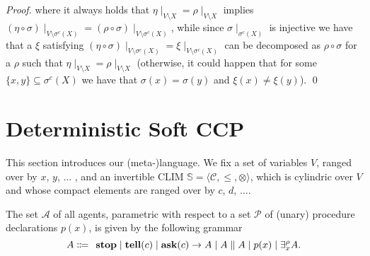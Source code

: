 \documentclass{llncs}
\newcommand{\comment}[1]{}
\newcommand{\tell}{{\bf tell}}
\newcommand{\ask}{{\bf ask}}
\newcommand{\ostop}{{\bf stop}}
\def\monop{\otimes}
\begin{document}
\begin{proof}
\noindent
where it always holds that $\eta\mid_{V \setminus X} = \rho\mid_{V \setminus X}$ implies $(\eta\circ \sigma)\mid_{V \setminus \sigma^{c}(X)} = (\rho\circ \sigma)\mid_{V \setminus \sigma^{c}(X)}$,
while since $\sigma \mid_{\sigma^c(X)}$ is injective we have that
a $\xi$ satisfying $(\eta \circ \sigma)\mid_{V \setminus \sigma^{c}(X)} = \xi\mid_{V \setminus \sigma^{c}(X)}$ can be decomposed as $\rho\circ \sigma$
for a $\rho$ such that $\eta\mid_{V \setminus X} = \rho\mid_{V \setminus X}$
(otherwise, it could happen that for some $\{x, y\} \subseteq \sigma^c(X)$ we have that $\sigma(x) =\sigma(y)$ and 
$\xi(x) \neq \xi(y)$).
\qed
\end{proof}

%


\comment{
Note also that the diagonal elements are not guaranteed to be $\monop$-compact,
even if they have finite support, since $\top$ is not necessarily so.
%
To this end, we close the section by adding the simple result below to the soft constraint lore.

\begin{proposition}
	Let $c \in \mathbb{C}$ be a constraint. It is $\monop$-compact if and only if it has finite support and 
	$c\eta$ is $\monop$-compact for all $\eta$.
\end{proposition}
}

\section{Deterministic Soft CCP}\label{sec:detSCCP}
This section introduces our (meta-)language.
We fix a set of variables $V$, ranged over by $x$, $y$, $\ldots$ , and 
an invertible CLIM $\mathbb S = \langle {\mathcal C}, \leq, \otimes\rangle$, which is 
cylindric over $V$ and whose compact elements
are ranged over by $c$, $d$, $\ldots$.

\begin{definition}[Agents]%
The set $\mathcal{A}$ of all agents, %
parametric with respect to a set $\mathcal{P}$ of (unary) procedure declarations $p(x)$,
is given by the following grammar
\[ A \Coloneqq \: \: \mathit{\ostop} \mid \textit{\tell}(c)  \mid \textit{\ask}(c) \rightarrow A \mid A \parallel A \mid %
p(x) \mid \exists^{\rho}_x A.\]  
\end{definition}
\end{document}
